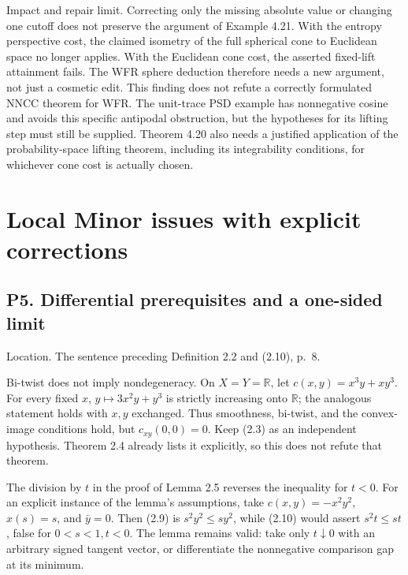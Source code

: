 \documentclass[10pt]{article}
\begin{document}
Impact and repair limit. Correcting only the missing absolute value or changing one cutoff does not preserve the argument of Example 4.21. With the entropy perspective cost, the claimed isometry of the full spherical cone to Euclidean space no longer applies. With the Euclidean cone cost, the asserted fixed-lift attainment fails. The WFR sphere deduction therefore needs a new argument, not just a cosmetic edit. This finding does not refute a correctly formulated NNCC theorem for WFR. The unit-trace PSD example has nonnegative cosine and avoids this specific antipodal obstruction, but the hypotheses for its lifting step must still be supplied. Theorem 4.20 also needs a justified application of the probability-space lifting theorem, including its integrability conditions, for whichever cone cost is actually chosen.\par
\section*{Local Minor issues with explicit corrections}
\subsection*{P5. Differential prerequisites and a one-sided limit}
Location. The sentence preceding Definition 2.2 and (2.10), p. 8.\par
Bi-twist does not imply nondegeneracy. On \(X=Y=\mathbb R\), let \(c(x,y)=x^3y+xy^3\). For every fixed \(x\), \(y\mapsto3x^2y+y^3\) is strictly increasing onto \(\mathbb R\); the analogous statement holds with \(x,y\) exchanged. Thus smoothness, bi-twist, and the convex-image conditions hold, but \(c_{xy}(0,0)=0\). Keep (2.3) as an independent hypothesis. Theorem 2.4 already lists it explicitly, so this does not refute that theorem.\par
The division by \(t\) in the proof of Lemma 2.5 reverses the inequality for \(t<0\). For an explicit instance of the lemma’s assumptions, take \(c(x,y)=-x^2y^2\), \(x(s)=s\), and \(\bar y=0\). Then (2.9) is \(s^2y^2\le sy^2\), while (2.10) would assert \(s^2t\le st\), false for \(0<s<1,t<0\). The lemma remains valid: take only \(t\downarrow0\) with an arbitrary signed tangent vector, or differentiate the nonnegative comparison gap at its minimum.\par
\end{document}
